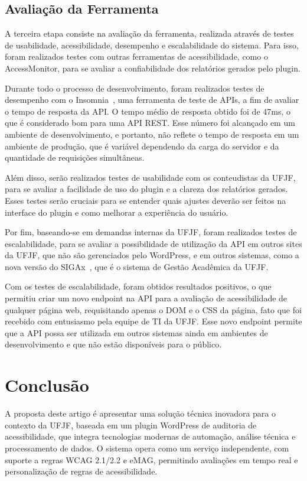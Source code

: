 \documentclass[
	article,			%
	12pt,				%
	oneside,			%
	a4paper,			%
	section=TITLE,		%
	subsection=TITLE,	%
	english,			%
	brazil,				%
	sumario=tradicional
	]{abntex2}
\begin{document}
\subsection{Avaliação da Ferramenta}
A terceira etapa consiste na avaliação da ferramenta, realizada 
através de testes de usabilidade, acessibilidade, desempenho e escalabilidade
do sistema. Para isso, foram realizados testes com outras ferramentas de
acessibilidade, como o AccessMonitor, para se avaliar a
confiabilidade dos relatórios gerados pelo plugin.

Durante todo o processo
de desenvolvimento, foram realizados testes de desempenho com o Insomnia~\cite{insomnia},
uma ferramenta de teste de APIs, a fim de avaliar o tempo de resposta da API. 
O tempo médio de resposta obtido foi de 47ms, o que é considerado
bom para uma API REST. Esse número foi alcançado em um ambiente
de desenvolvimento, e portanto, não reflete o tempo de resposta em um
ambiente de produção, que é variável dependendo da
carga do servidor e da quantidade de requisições simultâneas.

Além disso, serão realizados testes de usabilidade com os conteudistas da
UFJF, para se avaliar a facilidade de uso do plugin e a clareza dos relatórios
gerados. Esses testes serão cruciais para se entender quais ajustes deverão
ser feitos na interface do plugin e como melhorar a experiência do usuário.

Por fim, baseando-se em demandas internas da UFJF, foram realizados testes
de escalabilidade, para se avaliar a possibilidade de utilização da API
em outros sites da UFJF, que não são gerenciados pelo WordPress, e em outros sistemas, 
como a nova versão do SIGAx~\cite{SIGAx}, que é o sistema de Gestão Acadêmica da UFJF\@.

Com os testes de escalabilidade, foram obtidos resultados positivos, o que 
permitiu criar um novo endpoint na API para a avaliação de acessibilidade
de qualquer página web, requisitando apenas o DOM e o CSS da página, fato que foi recebido
com entusiasmo pela equipe de TI da UFJF\@. Esse novo endpoint permite que
a API possa ser utilizada em outros sistemas ainda em ambientes de desenvolvimento 
e que não estão disponíveis para o público.

\section{Conclusão}
A proposta deste artigo é apresentar uma solução técnica inovadora para o
contexto da UFJF, baseada em um plugin WordPress de auditoria de acessibilidade, 
que integra tecnologias modernas de automação, análise técnica e
processamento de dados. O sistema opera como um serviço independente, com
suporte a regras WCAG 2.1/2.2 e eMAG, permitindo avaliações em tempo real
e personalização de regras de acessibilidade.
\end{document}
